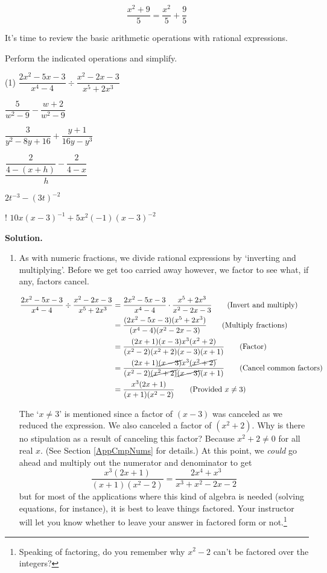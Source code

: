 \[ \dfrac{x^2+9}{5} = \dfrac{x^2}{5} + \dfrac{9}{5} \] 

It's time to review the basic arithmetic operations with rational expressions. 

\begin{ex} \label{rationalexpressionreviewex} Perform the indicated operations and simplify.

\begin{tasks}(1)
\task  $\dfrac{2x^2-5x-3}{x^4 - 4} \div \dfrac{x^2-2x-3}{x^5 + 2x^3}$

\task  $\dfrac{5}{w^2 - 9} - \dfrac{w+2}{w^2-9}$

\task  $\dfrac{3}{y^2 - 8y + 16} + \dfrac{y+1}{16y - y^3}$

\task  $\dfrac{\dfrac{2}{4 - (x+h)} - \dfrac{2}{4-x}}{h}$

\task  $2t^{-3} - (3t)^{-2}$

\task!  $10x(x-3)^{-1} + 5x^2(-1)(x-3)^{-2}$

\end{tasks}

{\bf Solution.}

\begin{enumerate}

\item As with numeric fractions, we divide rational expressions by `inverting and multiplying'.  Before we get too carried away however, we factor to see what, if any, factors cancel.

\begin{align*}
\dfrac{2x^2-5x-3}{x^4 - 4} \div \dfrac{x^2-2x-3}{x^5 + 2x^3} & = \dfrac{2x^2-5x-3}{x^4 - 4} \cdot \dfrac{x^5 + 2x^3}{x^2-2x-3} \tag{Invert and multiply} \\ 
& = \dfrac{(2x^2-5x-3)(x^5 + 2x^3)}{(x^4 - 4)(x^2-2x-3)} \tag{Multiply fractions}  \\ 
& = \dfrac{(2x+1)(x-3)x^3(x^2+2)}{(x^2-2)(x^2+2)(x-3)(x+1)} \tag{Factor} \\ 
& = \dfrac{(2x+1)\cancel{(x-3)}x^3\cancel{(x^2+2)}}{(x^2-2)\cancel{(x^2+2)}\cancel{(x-3)}(x+1)} \tag{Cancel common factors} \\ 
& = \dfrac{x^3(2x+1)}{(x+1)(x^2-2)} \tag{Provided $x \neq 3$} \\
\end{align*}

The `$x \neq 3$' is mentioned since a factor of $(x-3)$ was canceled as we reduced the expression.  We also canceled a factor of $(x^2+2)$.  Why is there no stipulation as a result of canceling this factor? Because $x^2 + 2 \neq 0$ for all real $x$. (See Section \ref{AppCmpNums} for details.)  At this point, we \textit{could} go ahead and multiply out the numerator and denominator to get \[\dfrac{x^3(2x+1)}{(x+1)(x^2-2)}  = \dfrac{2x^4 + x^3}{x^3+x^2-2x-2}\] but for most of the applications where this kind of algebra is needed (solving equations, for instance), it is best to leave things factored.  Your instructor will let you know whether to leave your answer in factored form or not.\footnote{Speaking of factoring, do you remember why $x^2-2$ can't be factored over the integers?}


\end{enumerate}
\end{ex}
